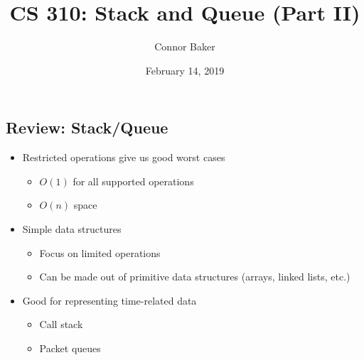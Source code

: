 \documentclass[10pt]{article}
\title{CS 310: Stack and Queue (Part II)}
\author{Connor Baker}
\date{February 14, 2019}
\begin{document}
\maketitle

\subsection*{Review: Stack/Queue}
\begin{itemize}
    \item Restricted operations give us good worst cases
    \begin{itemize}
        \item $O(1)$ for all supported operations
        \item $O(n)$ space
    \end{itemize}
    \item Simple data structures
    \begin{itemize}
        \item Focus on limited operations
        \item Can be made out of primitive data structures (arrays, linked lists, etc.)
    \end{itemize}
    \item Good for representing time-related data
    \begin{itemize}
        \item Call stack
        \item Packet queues
    \end{itemize}
\end{itemize}
\end{document}
